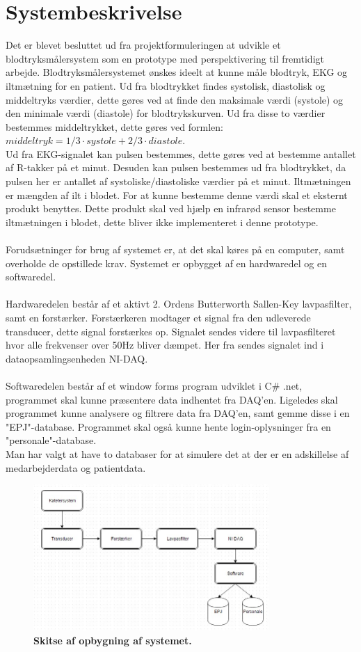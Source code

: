 \section{Systembeskrivelse}
Det er blevet besluttet ud fra projektformuleringen at udvikle et blodtryksmålersystem som en prototype med perspektivering til fremtidigt arbejde. Blodtryksmålersystemet ønskes ideelt at kunne måle blodtryk, EKG og iltmætning for en patient. Ud fra blodtrykket findes systolisk, diastolisk og middeltryks værdier, dette gøres ved at finde den maksimale værdi (systole) og den minimale værdi (diastole) for blodtrykskurven. Ud fra disse to værdier bestemmes middeltrykket, dette gøres ved formlen: $middeltryk = 1/3 \cdot systole + 2/3 \cdot diastole$. \cite{blodtrykwiki}
\\ Ud fra EKG-signalet kan pulsen bestemmes, dette gøres ved at bestemme antallet af R-takker på et minut. Desuden kan pulsen bestemmes ud fra blodtrykket, da pulsen her er antallet af systoliske/diastoliske værdier på et minut. Iltmætningen er mængden af ilt i blodet. For at kunne bestemme denne værdi skal et eksternt produkt benyttes. Dette produkt skal ved hjælp en infrarød sensor bestemme iltmætningen i blodet, dette bliver ikke implementeret i denne prototype.\\\\
Forudsætninger for brug af systemet er, at det skal køres på en computer, samt overholde de opstillede krav. Systemet er opbygget af en hardwaredel og en softwaredel. \\\\
Hardwaredelen består af et aktivt 2. Ordens Butterworth Sallen-Key lavpasfilter, samt en forstærker. Forstærkeren modtager et signal fra den udleverede transducer, dette signal forstærkes op. Signalet sendes videre til lavpasfilteret hvor alle frekvenser over 50Hz bliver dæmpet. Her fra sendes signalet ind i dataopsamlingsenheden NI-DAQ.\\\\
Softwaredelen består af et window forms program udviklet i C\# .net, programmet skal kunne præsentere data indhentet fra DAQ’en. Ligeledes skal programmet kunne analysere og filtrere data fra DAQ’en, samt gemme disse i en "EPJ"-database. Programmet skal også kunne hente login-oplysninger fra en "personale"-database. \\
Man har valgt at have to databaser for at simulere det at der er en adskillelse af medarbejderdata og patientdata.
\begin{figure}[H]
\includegraphics[width =0.8\textwidth , center]{billeder/system}
\caption{\textbf{Skitse af opbygning af systemet.}}
\end{figure}
\newpage
